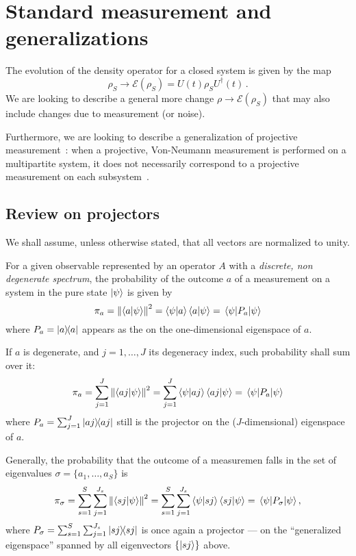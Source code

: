 \section{Standard measurement and generalizations}

The evolution of the density operator for a closed system is given by the map
\[
    \rho_{S} \rightarrow \mathcal{E}(\rho_{S}) = U(t)\rho_{S}U^{\dagger}(t) \, \text{.}
\] 
We are looking to describe a general more change
$\rho \rightarrow \mathcal{E}(\rho_{S})$ that may also include
changes due to measurement (or noise).

Furthermore, we are looking to describe a generalization
of projective measurement~\parencite{VonNeumann}:
when a projective, Von-Neumann
measurement is performed on a multipartite system,
it does not necessarily correspond to a projective measurement
on each subsystem~\parencite[Ch. 3]{PreskillNotes}.

\subsection{Review on projectors}

We shall assume, unless otherwise stated, that all vectors are
normalized to unity.

For a given observable represented by an operator $A$ with a
\emph{discrete, non degenerate spectrum}, the probability of the
outcome $a$ of a
measurement on a system in the pure state $\ket{\psi}$ is given by
$$
\pi_{a} = \norm{\braket{a}{\psi}}^2
        = \bra{\psi}\ket{a}\bra{a}\ket{\psi}
        = \mel{\psi}{P_{a}}{\psi}
$$
where $P_{a} = \ketbra{a}$ appears as the  on the
one-dimensional ei\-gen\-space of  $a$.

If $a$ is degenerate, and $j = 1, \dots, J$ its degeneracy index,
such probability shall sum over it:
$$
\pi_{a} = \sum_{j=1}^{J}\norm{\braket{aj}{\psi}}^2
        = \sum_{j=1}^{J}\bra{\psi}\ket{aj}\bra{aj}\ket{\psi}
        = \mel{\psi}{P_{a}}{\psi}
$$
where $P_{a} = \sum_{j=1}^{J}\ketbra{aj}$
still is the projector on the
($J$-dimensional) eigenspace of $a$.

Generally, the probability that the outcome of a measuremen falls in
the set of eigenvalues $\sigma = \{a_{1}, \dots, a_{S}\}$ is
\begin{equation}\label{eq:pi_sigma}
\pi_{\sigma}  = \sum_{s=1}^{S}\sum_{j=1}^{J_{s}}\norm{\braket{sj}{\psi}}^2
              = \sum_{s=1}^{S}\sum_{j=1}^{J_{s}}\bra{\psi}\ket{sj}\bra{sj}\ket{\psi}
              = \mel{\psi}{P_{\sigma}}{\psi}
              ,
\end{equation}
where $P_{\sigma} = \sum_{s=1}^{S}\sum_{j=1}^{J_{s}}\ketbra{sj}$
is once again a projector --- on the ``generalized eigenspace'' spanned by all
eigenvectors $\{\ket{sj}\}$ above.




